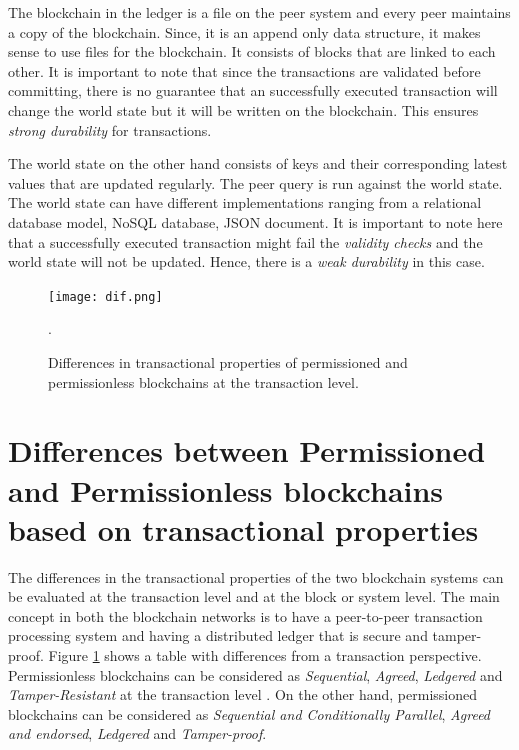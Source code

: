 \documentclass[
  a4paper,  %
  twoside,  %
  bibliography=totoc,
  headsepline,
  cleardoublepage=empty,
  parskip=half,
  draft=false
]{scrbook}
\begin{document}
The blockchain in the ledger is a file on the peer system and every peer maintains a copy of the blockchain. Since, it is an append only data structure, it makes sense to use files for the blockchain. It consists of blocks that are linked to each other. It is important to note that since the transactions are validated before committing, there is no guarantee that an successfully executed transaction will change the world state but it will be written on the blockchain. This ensures \textit{strong durability} for transactions.

The world state on the other hand consists of keys and their corresponding latest values that are updated regularly. The peer query is run against the world state. The world state can have different implementations ranging from a relational database model, NoSQL database, JSON document. It is important to note here that a successfully executed transaction might fail the \textit{validity checks} and the world state will not be updated. Hence, there is a \textit{weak durability} in this case.

\begin{figure}[t!]
\begin{center}
\texttt{[image: dif.png]}
\caption{Differences in transactional properties of permissioned and permissionless blockchains at the transaction level.}.
\label{fig:dif}
\end{center}
\end{figure}

\section{Differences between Permissioned and Permissionless blockchains based on transactional properties}
The differences in the transactional properties of the two blockchain systems can be evaluated at the transaction level and at the block or system level. The main concept in both the blockchain networks is to have a peer-to-peer transaction processing system and having a distributed ledger that is secure and tamper-proof. Figure \ref{fig:dif} shows a table with differences from a transaction perspective. Permissionless blockchains can be considered as \textit{Sequential}, \textit{Agreed}, \textit{Ledgered} and \textit{Tamper-Resistant} at the transaction level \cite{Salt}. On the other hand, permissioned blockchains can be considered as \textit{Sequential and Conditionally Parallel}, \textit{Agreed and endorsed}, \textit{Ledgered} and \textit{Tamper-proof}. 
\end{document}
